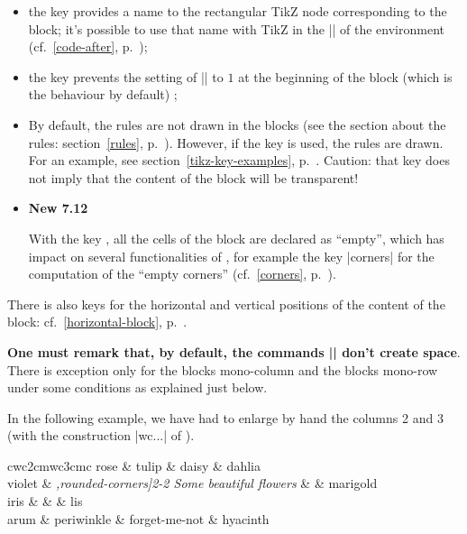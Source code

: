 \documentclass[dvipsnames]{article}
\def\interitem{\vspace{7mm plus 2 mm minus 3mm}}
\begin{document}
\begin{itemize}
\item {}
the key  provides a name to the rectangular TikZ node
corresponding to the block; it's possible to use that name with TikZ in the
|\CodeAfter| of the environment (cf.~\ref{code-after}, p.~\pageref{code-after});
\item {}
the key  prevents the setting of
|\arraystretch| to $1$ at the beginning of the block (which is the behaviour
by default) ;
\item {}
By default, the rules are not drawn in the blocks (see the section about
the rules: section~\ref{rules}, p.~\pageref{rules}). However, if the key
 is used, the rules are drawn. For an example, see
section~\ref{tikz-key-examples}, p.~\pageref{tikz-key-examples}. Caution:
that key does not imply that the content of the block will be transparent!

\item {}

\colorbox{yellow!50}{\textbf{New 7.12}}

\nobreak
With the key , all the cells of the block are declared as
``empty'', which has impact on several functionalities of , for
example the key |corners| for the computation of the ``empty corners''
(cf.~\ref{corners}, p.~\pageref{corners}).
\end{itemize}

There is also keys for the horizontal and vertical positions of the content of
the block: cf.~\ref{horizontal-block}, p.~\pageref{horizontal-block}.

\interitem
{\bfseries One must remark that, by default, the commands |\Blocks| don't create
  space}. There is exception only for the blocks mono-column and the blocks
mono-row under some conditions as explained just below.

\medskip
In the following example, we have had to enlarge by hand the columns 2 and 3
(with the construction |w{c}{...}| of ).

\bigskip
\begin{Code}
\begin{NiceTabular}{cw{c}{2cm}w{c}{3cm}c}
  rose & tulip & daisy & dahlia \\
  violet 
    & \emph{\Block[C,draw=red,fill=[RGB]{204,204,255},rounded-corners]{2-2}
            {\LARGE Some beautiful flowers}} & & marigold \\
  iris & & & lis \\
  arum & periwinkle & forget-me-not &  hyacinth
\end{NiceTabular}
\end{Code}
\end{document}
